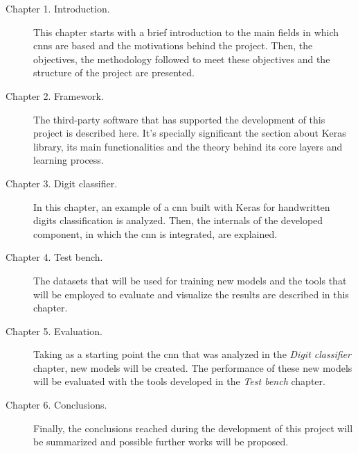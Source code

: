 \begin{description}
	\item[Chapter 1. Introduction.] This chapter starts with a brief introduction to the main fields in which \glspl{cnn} are based and the motivations behind the project. Then, the objectives, the methodology followed to meet these objectives and the structure of the project are presented.
	\item[Chapter 2. Framework.] The third-party software that has supported the development of this project is described here. It's specially significant the section about Keras library, its main functionalities and the theory behind its core layers and learning process.
	\item[Chapter 3. Digit classifier.] In this chapter, an example of a \gls{cnn} built with Keras for handwritten digits classification is analyzed. Then, the internals of the developed component, in which the \gls{cnn} is integrated, are explained.
	\item[Chapter 4. Test bench.] The datasets that will be used for training new models and the tools that will be employed to evaluate and visualize the results are described in this chapter.
	\item[Chapter 5. Evaluation.] Taking as a starting point the \gls{cnn} that was analyzed in the \textit{Digit classifier} chapter, new models will be created. The performance of these new models will be evaluated with the tools developed in the \textit{Test bench} chapter.
	\item[Chapter 6. Conclusions.] Finally, the conclusions reached during the development of this project will be summarized and possible further works will be proposed.
\end{description}
